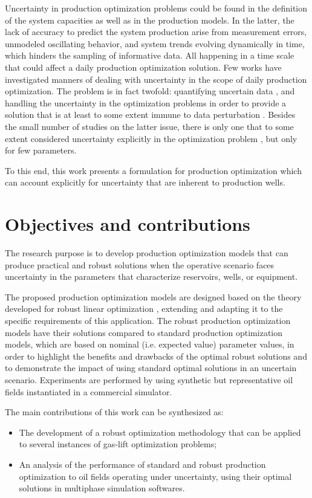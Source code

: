 %
Uncertainty in production optimization problems could be found in the definition of the system capacities as well as in the production models. In the latter, the lack of accuracy to predict the system production arise from measurement errors, unmodeled oscillating behavior, and system trends evolving dynamically in time, which hinders the sampling of informative data. All happening in a time scale that could affect a daily production optimization solution.
%
Few works have investigated manners of dealing with uncertainty in the scope of daily production optimization. The problem is in fact twofold: quantifying uncertain data \cite{Elgsaeter2008}, and handling the uncertainty in the optimization problems in order to provide a solution that is at least to some extent immune to data perturbation \cite{Nakashima2006,Bieker2007b,Elgsaeter2010}.
%
Besides the small number of studies on the latter issue, there is only one that to some extent considered uncertainty explicitly in the optimization problem \cite{Bieker2007b}, but only for few parameters.
%

%
To this end, this work presents a formulation for production optimization which can account explicitly for uncertainty that are inherent to production wells.
%
\section{Objectives and contributions}
The research purpose is to develop production optimization models that can produce  practical and robust solutions when the operative scenario faces uncertainty in the parameters that characterize reservoirs, wells, or equipment.
%

The proposed production optimization models are designed based on the theory developed for robust linear optimization \cite{Ben-Tal1999,Nemirovski2000,AharonBen-Tal2009,Bertismas2011}, extending and adapting it to the specific requirements of this application.
%
The robust production optimization models have their solutions compared to standard production optimization models, which are based on nominal (i.e. expected value) parameter values, in order to highlight the benefits and drawbacks of the optimal robust solutions and to demonstrate the impact of using standard optimal solutions in an uncertain scenario.
%
Experiments are performed by using synthetic but representative oil fields instantiated in a commercial simulator.
%

The main contributions of this work can be synthesized as:
%
\begin{itemize}
 \item The development of a robust optimization methodology that can be applied to several instances of gas-lift optimization problems;
 \item An analysis of the performance of standard and robust production optimization to oil fields operating under uncertainty, using their optimal solutions in multiphase simulation softwares.
\end{itemize}
%

